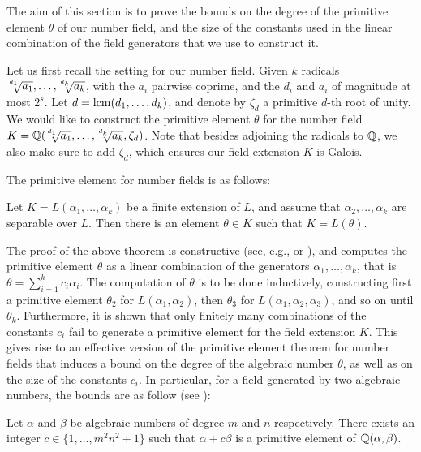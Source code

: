 The aim of this section is to prove the bounds on the degree of the primitive element $\theta$ of our number field, and the size of the constants used in the linear combination of the field generators that we use to construct it.

Let us first recall the setting for our number field. Given $k$ radicals $\mysqrt{d_1}{a_1},\ldots,\mysqrt{d_k}{a_k}$, with the $a_i$ pairwise coprime, and the $d_i$ and $a_i$ of magnitude at most $2^s$. Let $d=\operatorname{lcm}(d_1,\ldots,d_k)$, and denote by $\zeta_d$ a primitive $d$-th root of unity. We would like to construct the primitive element $\theta$ for the number field $K = \QQ(\mysqrt{d_1}{a_1},\ldots,\mysqrt{d_k}{a_k}, \zeta_d)$. Note that besides adjoining the radicals to $\mathbb{Q}$, we also make sure to add $\zeta_d$, which ensures our field extension $K$ is Galois.

The primitive element for number fields is as follows:

\begin{theorem}\label{th:primitive_el_theorem_number_fields}

Let $K = L(\alpha_1,\ldots,\alpha_k)$ be a finite extension of $L$, and assume that $\alpha_2,\ldots,\alpha_k$ are separable over $L$. Then there is an element $\theta\in K$ such that $K=L(\theta)$.
\end{theorem}

The proof of the above theorem is constructive (see, e.g., \cite[Theorem~4.1.8]{cohen2013course} or \cite[Theorem 5.1]{milneGalTheory}), and computes the primitive element $\theta$ as a linear combination of the generators $\alpha_1,\ldots,\alpha_k$, that is $\theta = \sum_{i=1}^k c_i \alpha_i$. The computation of $\theta$ is to be done inductively, constructing first a primitive element $\theta_2$ for $L(\alpha_1,\alpha_2)$, then $\theta_3$ for $L(\alpha_1, \alpha_2,\alpha_3)$, and so on until $\theta_k$. Furthermore, it is shown that only finitely many combinations of the constants $c_i$ fail to generate a primitive element for the field extension $K$. This gives rise to an effective version of the primitive element theorem for number fields that induces a bound on the degree of the algebraic number $\theta$, as well as on the size of the constants $c_i$. In particular, for a field generated by two algebraic numbers, the bounds are as follow (see \cite[Proposition 6.6]{kururPhd}):

\begin{proposition}\label{prop:effective_primitive_el_th}
    Let $\alpha$ and $\beta$ be algebraic numbers of degree $m$ and $n$ respectively. There exists an integer $c\in\{1,\ldots,m^2n^2+1\}$ such that $\alpha+c\beta$ is a primitive element of $\mathbb{Q}(\alpha,\beta)$.
\end{proposition}

